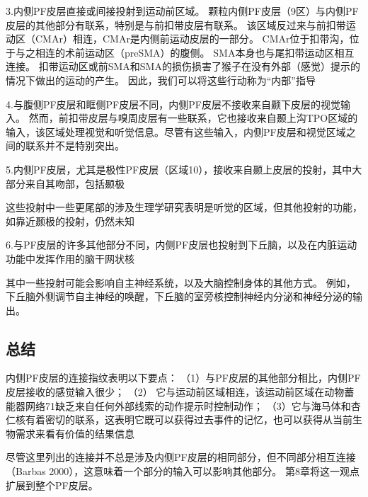 3.内侧PF皮层直接或间接投射到运动前区域。
颗粒内侧PF皮层（9区）与内侧PF皮层的其他部分有联系，特别是与前扣带皮层有联系\cite{Vogt&Pandya 1987}。
该区域反过来与前扣带运动区（CMAr）相连，CMAr是内侧前运动皮层的一部分\cite{Morecraft&VanHoesen,1998}。
CMAr位于扣带沟\cite{Dum&Strick,2002}，位于与之相连的术前运动区（preSMA）的腹侧\cite{Luppino et al.1993}。
SMA本身也与尾扣带运动区相互连接\cite{Luppino et al.1993}。
扣带运动区或前SMA和SMA的损伤损害了猴子在没有外部（感觉）提示的情况下做出的运动的产生\cite{Thaler et al.1995}。
因此，我们可以将这些行动称为“内部”指导\par
4.与腹侧PF皮层和眶侧PF皮层不同，内侧PF皮层不接收来自颞下皮层的视觉输入\cite{Carmichael&Price 1995b;Kondo et al.2005}。
然而，前扣带皮层与嗅周皮层有一些联系，它也接收来自颞上沟TPO区域的输入\cite{Kondo et al.2005}，该区域处理视觉和听觉信息。尽管有这些输入，内侧PF皮层和视觉区域之间的联系并不是特别突出。\par


5.内侧PF皮层，尤其是极性PF皮层（区域10），接收来自颞上皮层的投射，其中大部分来自其吻部，包括颞极\cite{Barbas et al.1999;Kondo et al.2003}\par
这些投射中一些更尾部的涉及生理学研究表明是听觉的区域\cite{Hackett et al 1998}，但其他投射的功能，如靠近颞极的投射，仍然未知\par


6.与PF皮层的许多其他部分不同，内侧PF皮层也投射到下丘脑\cite{Rempel-Clower&Barbas,1998}，以及在内脏运动功能中发挥作用的脑干网状核\cite{Öngür et al.1998;Barbas et al.2003}\par


其中一些投射可能会影响自主神经系统，以及大脑控制身体的其他方式。
例如，下丘脑外侧调节自主神经的唤醒，下丘脑的室旁核控制神经内分泌和神经分泌的输出。\par



\subsection{总结}

内侧PF皮层的连接指纹表明以下要点：
（1）与PF皮层的其他部分相比，内侧PF皮层接收的感觉输入很少；
（2） 它与运动前区域相连，该运动前区域在动物蓄能器网络71缺乏来自任何外部线索的动作提示时控制动作；
（3）它与海马体和杏仁核有着密切的联系，这表明它既可以获得过去事件的记忆，也可以获得从当前生物需求来看有价值的结果信息\par


尽管这里列出的连接并不总是涉及内侧PF皮层的相同部分，但不同部分相互连接（Barbas 2000），这意味着一个部分的输入可以影响其他部分。
第8章将这一观点扩展到整个PF皮层。\par



